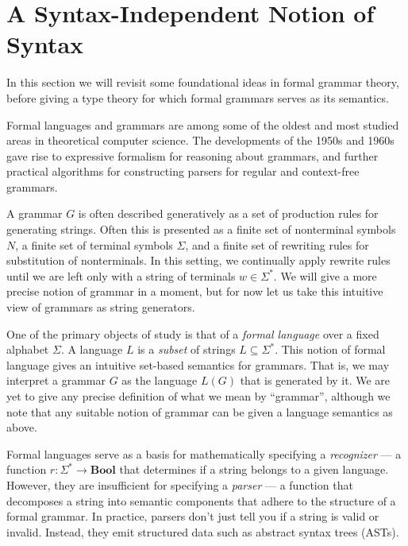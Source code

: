 \documentclass[acmsmall,screen,nonacm]{acmart}
\newcommand{\String}{\Sigma^{*}}
\newcommand{\Bool}{\mathbf{Bool}}
\newif\ifdraft
\renewcommand{\max}[1]{\ifdraft{\color{blue}[{\bf Max says}: #1]}\fi}
\begin{document}
\section{A Syntax-Independent Notion of Syntax}
\label{sec:synindsyn}


In this section we will revisit some foundational ideas in formal
grammar theory, before giving a type
theory for which formal grammars serves as its semantics.

Formal languages and grammars are among some of the oldest and most studied areas in
theoretical computer science. The developments of the 1950s and 1960s gave rise
to expressive formalism for reasoning about grammars, and further practical
algorithms for constructing parsers for regular and context-free grammars.

A grammar $G$ is often described generatively as a set of production rules for
generating strings. Often this is presented as a finite set of nonterminal
symbols $N$, a finite set of terminal symbols $\Sigma$, and a finite set of rewriting
rules for substitution of nonterminals. In this setting, we continually apply
rewrite rules until we are left only with a string of terminals
$w \in \String$. We will give a more precise notion of
grammar in a moment, but for now let us take this intuitive view of grammars as
string generators.

One of the primary objects of study is that of a \emph{formal language} over
a fixed alphabet $\Sigma$. A language $L$ is a \emph{subset} of strings
$L \subseteq \String$. This notion of formal language gives an intuitive
set-based semantics for grammars. That is, we may interpret a grammar $G$ as the
language $L(G)$ that is generated by it. We are yet to give any precise
definition of what we mean by ``grammar'', although we note that any suitable
notion of grammar can be given a language semantics as above.

Formal languages serve as a basis for mathematically specifying a
\emph{recognizer} --- a
function $r : \String \to \Bool$ that determines if a string belongs to a
given language. However, they are insufficient for specifying a \emph{parser}
--- a function that decomposes a string into semantic components that adhere to
the structure of a formal grammar. In practice, parsers don't just tell you
if a string is valid or invalid. Instead, they emit structured data such as
abstract syntax trees (ASTs).
\end{document}
